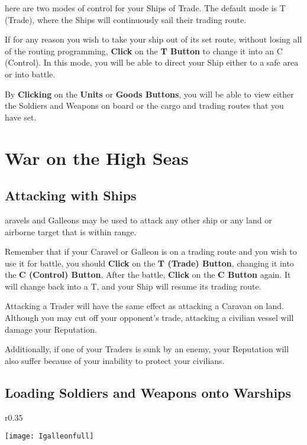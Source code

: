 here are two modes of control for your Ships of Trade. The default mode is T (Trade), where the Ships will continuously sail their trading route.

If for any reason you wish to take your ship out of its set route, without losing all of the routing programming, \textbf{Click} on the \textbf{T Button} to change it into an C (Control). In this mode, you will be able to direct your Ship either to a safe area or into battle.

By \textbf{Clicking} on the \textbf{Units} or \textbf{Goods Buttons}, you will be able to view either the Soldiers and Weapons on board or the cargo and trading routes that you have set.

\section{\textsf{War on the High Seas}}


\subsection{\textsf{Attacking with Ships}}

aravels and Galleons may be used to attack any other ship or any land or airborne target that is within range.

Remember that if your Caravel or Galleon is on a trading route and you wish to use it for battle, you should \textbf{Click} on the \textbf{T (Trade) Button}, changing it into the \textbf{C (Control) Button}. After the battle, \textbf{Click} on the \textbf{C Button} again. It will change back into a T, and your Ship will resume its trading route.

Attacking a Trader will have the same effect as attacking a Caravan on land. Although you may cut off your opponent’s trade, attacking a civilian vessel will damage your Reputation.

Additionally, if one of your Traders is sunk by an enemy, your Reputation will also suffer because of your inability to protect your civilians.

\subsection{\textsf{Loading Soldiers and Weapons onto Warships}}

\begin{wrapfigure}{r}{0.35\textwidth}
    \vspace{-20pt}
    \begin{center}
        \texttt{[image: Igalleonfull]} %
    \end{center}
    \vspace{-10pt} %
\end{wrapfigure}

